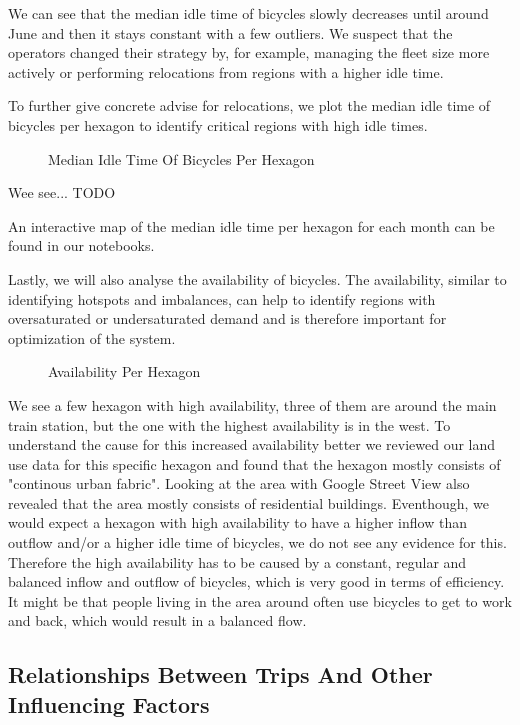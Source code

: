 We can see that the median idle time of bicycles slowly decreases until around
June and then it stays constant with a few outliers. We suspect that the
operators changed their strategy by, for example, managing the fleet size more
actively or performing relocations from regions
with a higher idle time.

To further give concrete advise for relocations, we plot the median idle time
of bicycles per hexagon to identify critical regions with high idle times.

\begin{figure}[htb]
    \centering
    \caption{Median Idle Time Of Bicycles Per Hexagon}
    \label{fig:descriptive_analysis_idle_time_hexagon}
\end{figure}

Wee see... TODO


An interactive map of the median idle time per hexagon for each month can be
found in our notebooks.

Lastly, we will also analyse the availability of bicycles. The availability,
similar to identifying hotspots and imbalances, can help to identify regions
with oversaturated or undersaturated demand and is therefore important for
optimization of the system.


\begin{figure}[htb]
    \centering
    \caption{Availability Per Hexagon}
    \label{fig:descriptive_analysis_availability_per_hexagon}
\end{figure}

We see a few hexagon with high availability, three of them are around the main
train station, but the one with the highest availability is in the west. To
understand the cause for this increased availability better we reviewed our
land use data for this specific hexagon and found that the hexagon mostly
consists of "continous urban fabric". Looking at the area with Google Street
View also revealed that the area mostly consists of residential buildings.
Eventhough, we would expect a hexagon with high availability to have a higher
inflow than outflow and/or a higher idle time of bicycles, we do not see any
evidence for this. Therefore the high availability has to be caused by a constant,
regular and balanced inflow and outflow of bicycles, which is very good in
terms of efficiency. It might be that people living in the area around often
use bicycles to get to work and back, which would result in a balanced flow.


\subsection{Relationships Between Trips And Other Influencing Factors}
\label{subsec:descriptive_analysis_relationships}

